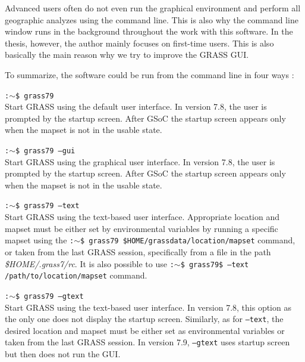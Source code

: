 \documentclass[a4paper,10pt,twoside]{article}
\begin{document}
\noindent Advanced users often do not even run the graphical
environment and perform all geographic analyzes using the command
line. This is also why the command line window runs in the background
throughout the work with this software. In the thesis, however, the author
mainly focuses on first-time users.
This is also basically the main reason why we try to
improve the GRASS GUI.  

\noindent To summarize, the software could be run from 
the command line in four ways \cite{startup}:

\noindent \texttt{:$\sim$\$ grass79} \\
\noindent Start GRASS using the default user interface. In version
7.8, the user is prompted by the startup screen. After GSoC the startup
screen appears only when the mapset is not in the usable state.

\noindent \texttt{:$\sim$\$ grass79 --gui}\\
\noindent Start GRASS using the graphical user interface.  In version
7.8, the user is prompted by the startup screen. After GSoC the startup
screen appears only when the mapset is not in the usable state.

\noindent \texttt{:$\sim$\$ grass79 --text} \\
\noindent Start GRASS using the text-based user interface. Appropriate
location and mapset must be either set by environmental variables 
by running a specific
mapset using the \texttt{:$\sim$\$ grass79
  \$HOME/grassdata/location/mapset} command, or taken from the last
GRASS session, specifically from a file in the path
\textit{\$HOME/.grass7/rc}.
It is also possible to use
\texttt{:$\sim$\$ grass79\$ --text /path/to/location/mapset} command.

\newpage
\noindent \texttt{:$\sim$\$ grass79 --gtext} \\
\noindent Start GRASS using the text-based user interface.  In version
7.8, this option as the only one does not display the startup
screen. Similarly, as for \texttt{--text},  the desired location and mapset must be 
either set as environmental variables or taken from the last
GRASS session. In version 7.9, \texttt{--gtext} uses startup
screen but then does not run the GUI.
\end{document}
